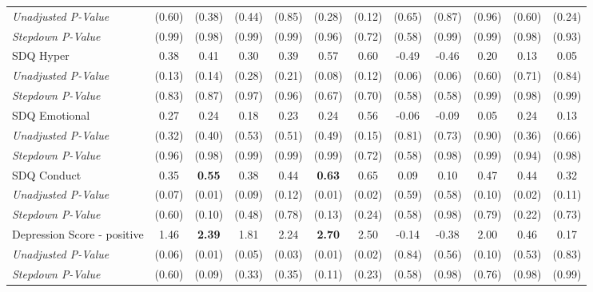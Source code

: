 \begin{tabular}{l c c c c c c c c c c c}
\quad \textit{Unadjusted P-Value} & (0.60) & (0.38) & (0.44) & (0.85) & (0.28) & (0.12) & (0.65) & (0.87) & (0.96) & (0.60) & (0.24) \\
\quad \textit{Stepdown P-Value} & (0.99) & (0.98) & (0.99) & (0.99) & (0.96) & (0.72) & (0.58) & (0.99) & (0.99) & (0.98) & (0.93) \\
SDQ Hyper & 0.38 & 0.41 & 0.30 & 0.39 & 0.57 & 0.60 & -0.49 & -0.46 & 0.20 & 0.13 & 0.05 \\
\quad \textit{Unadjusted P-Value} & (0.13) & (0.14) & (0.28) & (0.21) & (0.08) & (0.12) & (0.06) & (0.06) & (0.60) & (0.71) & (0.84) \\
\quad \textit{Stepdown P-Value} & (0.83) & (0.87) & (0.97) & (0.96) & (0.67) & (0.70) & (0.58) & (0.58) & (0.99) & (0.98) & (0.99) \\
SDQ Emotional & 0.27 & 0.24 & 0.18 & 0.23 & 0.24 & 0.56 & -0.06 & -0.09 & 0.05 & 0.24 & 0.13 \\
\quad \textit{Unadjusted P-Value} & (0.32) & (0.40) & (0.53) & (0.51) & (0.49) & (0.15) & (0.81) & (0.73) & (0.90) & (0.36) & (0.66) \\
\quad \textit{Stepdown P-Value} & (0.96) & (0.98) & (0.99) & (0.99) & (0.99) & (0.72) & (0.58) & (0.98) & (0.99) & (0.94) & (0.98) \\
SDQ Conduct & 0.35 & \textbf{ 0.55 } & 0.38 & 0.44 & \textbf{ 0.63 } & 0.65 & 0.09 & 0.10 & 0.47 & 0.44 & 0.32 \\
\quad \textit{Unadjusted P-Value} & (0.07) & (0.01) & (0.09) & (0.12) & (0.01) & (0.02) & (0.59) & (0.58) & (0.10) & (0.02) & (0.11) \\
\quad \textit{Stepdown P-Value} & (0.60) & (0.10) & (0.48) & (0.78) & (0.13) & (0.24) & (0.58) & (0.98) & (0.79) & (0.22) & (0.73) \\
Depression Score - positive & 1.46 & \textbf{ 2.39 } & 1.81 & 2.24 & \textbf{ 2.70 } & 2.50 & -0.14 & -0.38 & 2.00 & 0.46 & 0.17 \\
\quad \textit{Unadjusted P-Value} & (0.06) & (0.01) & (0.05) & (0.03) & (0.01) & (0.02) & (0.84) & (0.56) & (0.10) & (0.53) & (0.83) \\
\quad \textit{Stepdown P-Value} & (0.60) & (0.09) & (0.33) & (0.35) & (0.11) & (0.23) & (0.58) & (0.98) & (0.76) & (0.98) & (0.99) \\
\bottomrule
\end{tabular}
